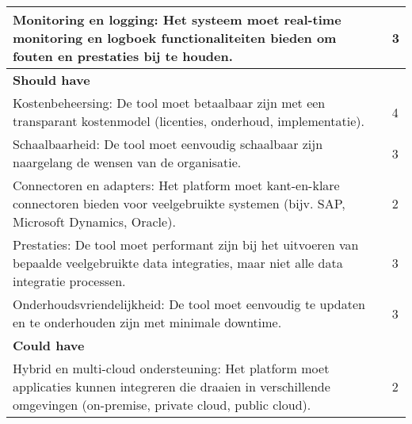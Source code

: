\begin{landscape}
\begin{table}[H]
{\begin{tabular}{|ll|}
\multicolumn{1}{|l|}{Monitoring en logging: Het systeem moet real-time monitoring en logboek functionaliteiten bieden om fouten en prestaties bij te houden.}                                                              & 3                            \\ \hline
\textbf{Should have}                                                                                                                                                                                                       &                              \\ \hline
\multicolumn{1}{|l|}{Kostenbeheersing: De tool moet betaalbaar zijn met een transparant kostenmodel (licenties, onderhoud, implementatie).}                                                                                & 4                            \\ \hline
\multicolumn{1}{|l|}{Schaalbaarheid: De tool moet eenvoudig schaalbaar zijn naargelang de wensen van de organisatie.}                                                                                                      & 3                            \\ \hline
\multicolumn{1}{|l|}{Connectoren en adapters: Het platform moet kant-en-klare connectoren bieden voor veelgebruikte systemen (bijv. SAP, Microsoft Dynamics, Oracle).}                                                     & 2                            \\ \hline
\multicolumn{1}{|l|}{Prestaties: De tool moet performant zijn bij het uitvoeren van bepaalde veelgebruikte data integraties, maar niet alle data integratie processen.}                                                    & 3                            \\ \hline
\multicolumn{1}{|l|}{Onderhoudsvriendelijkheid: De tool moet eenvoudig te updaten en te onderhouden zijn met minimale downtime.}                                                                                           & 3                            \\ \hline
\textbf{Could have}                                                                                                                                                                                                        &                              \\ \hline
\multicolumn{1}{|l|}{Hybrid en multi-cloud ondersteuning: Het platform moet applicaties kunnen integreren die draaien in verschillende omgevingen (on-premise, private cloud, public cloud).}                              & 2                            \\ \hline

\end{tabular}}
\end{table}
\end{landscape}
